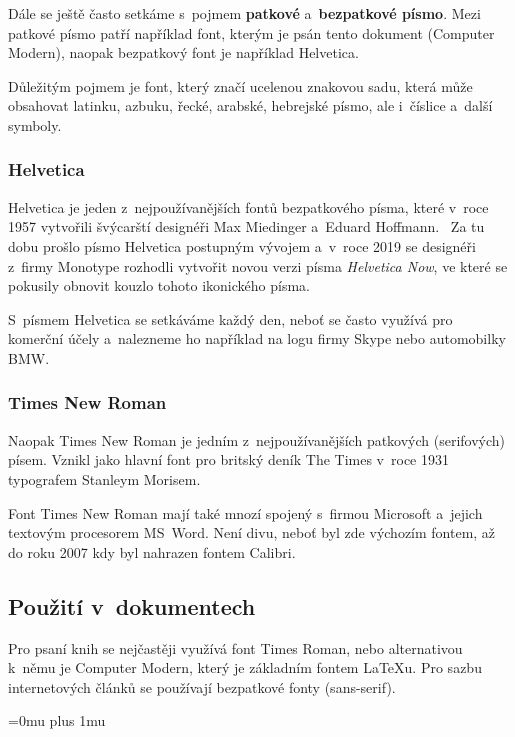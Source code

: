 \documentclass[a4paper, 11pt]{article}
\begin{document}
        Dále se ještě často setkáme s~pojmem \textbf{patkové} a~\textbf{bezpatkové písmo}. Mezi patkové písmo patří například font, kterým je psán tento dokument (Computer Modern), naopak bezpatkový font je například Helvetica.~\cite{Font:magazine}
        
        Důležitým pojmem je font, který značí ucelenou znakovou sadu, která může obsahovat latinku, azbuku, řecké, arabské, hebrejské písmo, ale i~číslice a~další symboly.~\cite{Janak:Pismo}
        
        \subsubsection{Helvetica}
            {\selectfont Helvetica} je jeden z~nejpoužívanějších fontů bezpatkového písma, které v~roce 1957 vytvořili švýcarští designéři Max Miedinger a~Eduard Hoffmann.~\cite{Razdik:Helvetica} 
            Za tu dobu prošlo písmo Helvetica postupným vývojem a~v~roce 2019 se designéři z~firmy Monotype rozhodli vytvořit novou verzi písma \emph{Helvetica Now}, ve které se pokusily obnovit kouzlo tohoto ikonického písma.~\cite{Wired:Helvetica}
            
            S~písmem Helvetica se setkáváme každý den, neboť se často využívá pro komerční účely a~nalezneme ho například na logu firmy Skype nebo automobilky BMW.
            
        \subsubsection{Times New Roman}
            Naopak  {\selectfont Times New Roman} je jedním z~nejpoužívanějších patkových (serifových) písem. Vznikl jako hlavní font pro britský deník The Times v~roce 1931 typografem Stanleym Morisem.~\cite{e15:TimesNewRoman}
            
            Font Times New Roman mají také mnozí spojený s~firmou Microsoft a~jejich textovým procesorem MS~Word. Není divu, neboť byl zde výchozím fontem, až do roku 2007 kdy byl nahrazen fontem Calibri.~\cite{PCWorld:Times}
    
    \subsection{Použití v~dokumentech}
        Pro psaní knih se nejčastěji využívá font Times Roman, nebo alternativou k~němu je Computer Modern, který je základním fontem \LaTeX u. Pro sazbu internetových článků se používají bezpatkové fonty (sans-serif).~\cite{Zobel:WritingForComputerScience}


\newpage
\Urlmuskip=0mu plus 1mu\relax


\end{document}
